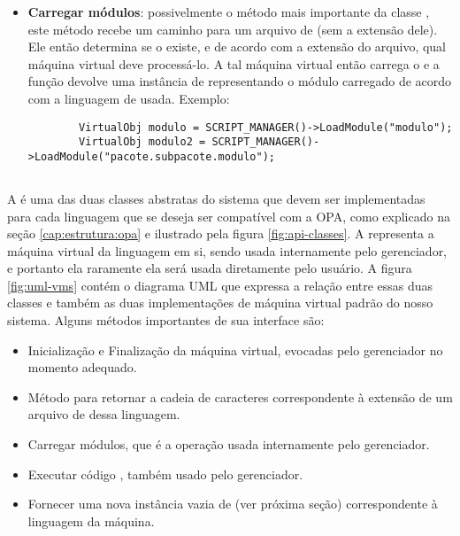 \begin{itemize}
    \item \textbf{Carregar módulos}: possivelmente o método mais importante da classe \SMgr{},
      este método recebe um caminho para um arquivo de \script{} (sem a extensão dele).
      Ele então determina se o \script{} existe, e de acordo com a extensão do arquivo,
      qual máquina virtual deve processá-lo.
      A tal máquina virtual então carrega o \script{} e a função devolve uma instância de \VObj{}
      representando o módulo carregado de acordo com a linguagem de \script{} usada. Exemplo:
      \vspace{1em}
      \begin{lstlisting}
        VirtualObj modulo = SCRIPT_MANAGER()->LoadModule("modulo");
        VirtualObj modulo2 = SCRIPT_MANAGER()->LoadModule("pacote.subpacote.modulo");
      \end{lstlisting}

  \end{itemize}

  \subsection{\VMac{}}
  \label{sec:atividades:opa:vmac}
  A \VMac{} é uma das duas classes abstratas do sistema que devem ser implementadas para
  cada linguagem que se deseja ser compatível com a OPA, como explicado na seção
  \ref{cap:estrutura:opa} e ilustrado pela figura \ref{fig:api-classes}.
  A \VMac{} representa a máquina virtual da linguagem em si, sendo usada internamente pelo 
  gerenciador, e portanto ela raramente ela será usada diretamente pelo usuário. A figura
  \ref{fig:uml-vms} contém o diagrama UML que expressa a relação entre essas duas classes
  e também as duas implementações de máquina virtual padrão do nosso sistema. Alguns
  métodos importantes de sua interface são:
  
  \begin{itemize}
    \item Inicialização e Finalização da máquina virtual, evocadas pelo gerenciador
      no momento adequado.
    \item Método para retornar a cadeia de caracteres correspondente à extensão de um 
      arquivo de \script{} dessa linguagem.
    \item Carregar módulos, que é a operação usada internamente pelo gerenciador.
    \item Executar código \script{}, também usado pelo gerenciador.
    \item Fornecer uma nova instância vazia de \VData{} (ver próxima seção) correspondente à
      linguagem da máquina.
  \end{itemize}

